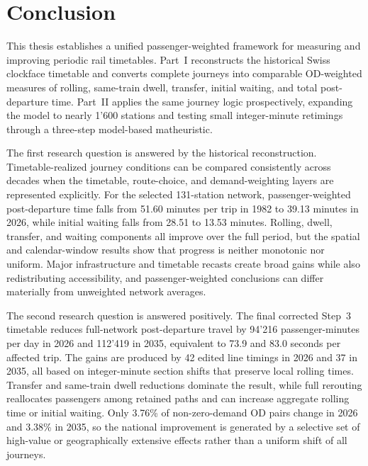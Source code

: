 \documentclass[preprint,12pt]{elsarticle}
\begin{document}
\clearpage
\section{Conclusion}\label{sec:conclusion}

This thesis establishes a unified passenger-weighted framework for measuring and improving periodic rail timetables. Part~I reconstructs the historical Swiss clockface timetable and converts complete journeys into comparable OD-weighted measures of rolling, same-train dwell, transfer, initial waiting, and total post-departure time. Part~II applies the same journey logic prospectively, expanding the model to nearly 1'600 stations and testing small integer-minute retimings through a three-step model-based matheuristic.

The first research question is answered by the historical reconstruction. Timetable-realized journey conditions can be compared consistently across decades when the timetable, route-choice, and demand-weighting layers are represented explicitly. For the selected 131-station network, passenger-weighted post-departure time falls from 51.60 minutes per trip in 1982 to 39.13 minutes in 2026, while initial waiting falls from 28.51 to 13.53 minutes. Rolling, dwell, transfer, and waiting components all improve over the full period, but the spatial and calendar-window results show that progress is neither monotonic nor uniform. Major infrastructure and timetable recasts create broad gains while also redistributing accessibility, and passenger-weighted conclusions can differ materially from unweighted network averages.

The second research question is answered positively. The final corrected Step~3 timetable reduces full-network post-departure travel by 94'216 passenger-minutes per day in 2026 and 112'419 in 2035, equivalent to 73.9 and 83.0 seconds per affected trip. The gains are produced by 42 edited line timings in 2026 and 37 in 2035, all based on integer-minute section shifts that preserve local rolling times. Transfer and same-train dwell reductions dominate the result, while full rerouting reallocates passengers among retained paths and can increase aggregate rolling time or initial waiting. Only 3.76\% of non-zero-demand OD pairs change in 2026 and 3.38\% in 2035, so the national improvement is generated by a selective set of high-value or geographically extensive effects rather than a uniform shift of all journeys.
\end{document}

